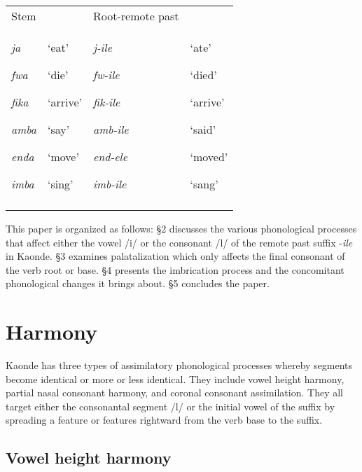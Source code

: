 \documentclass[output=paper]{langsci/langscibook}
\begin{document}
\begin{tabularx}{\textwidth}{XXXX}
\lsptoprule
Stem &  & Root-remote past & \\
{\emph{ja }}

{\emph{fwa }}

{\emph{fika }}

{\emph{amba }}

{\emph{enda }}

\emph{imba} & {‘eat’}

{‘die’}

{‘arrive’  }

{‘say’}

{‘move’  }

‘sing’ & {\emph{j-ile}}

{\emph{fw-ile}}

{\emph{fik-ile}}

{\emph{amb-ile}}

{\emph{end-ele  }}

\emph{imb-ile  } & {‘ate’}

{‘died’}

{‘arrive’}

{‘said’}

{‘moved’}

‘sang’\\
\lspbottomrule
\end{tabularx}

This paper is organized as follows: §2 discusses the various phonological processes that affect either the vowel /i/ or the consonant /l/ of the remote past suffix -\emph{ile} in Kaonde. §3 examines palatalization which only affects the final consonant of the verb root or base. §4 presents the imbrication process and the concomitant phonological changes it brings about. §5 concludes the paper.


\section{Harmony}

Kaonde has three types of assimilatory phonological processes whereby segments become identical or more or less identical. They include vowel height harmony, partial nasal consonant harmony, and coronal consonant assimilation. They all target either the consonantal segment /l/ or the initial vowel of the suffix by spreading a feature or features rightward from the verb base to the suffix.

\subsection{Vowel height harmony}
\end{document}

